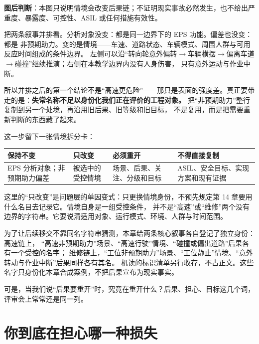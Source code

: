 \begin{noteblock}
\textbf{图后判断}：本图只说明情境会改变后果链；不证明现实事故必然发生，也不给出严重度、暴露度、可控性、ASIL 或任何措施有效性。
\end{noteblock}
把两条叙事并排看。分析对象没变：都是同一边界下的 EPS 功能。偏差也没变：都是
非预期助力。变的是情境——车速、道路状态、车辆模式、周围人群与可用反应时间组成的条件边界。
左侧可以沿“转向轮意外偏转\(\rightarrow\)车辆横摆\(\rightarrow\)偏离车道\(\rightarrow\)碰撞”继续推演；右侧在本教学边界内没有人身伤害，
只有意外运动与作业中断。

所以并排之后的第一个结论不是“高速更危险”——那只是表面的强度差。真正要带走的是：\textbf{失常名称不足以身份化我们正在评价的工程对象。} 把“非预期助力”整行复制到另一个处境，再沿用旧后果、旧等级和旧目标，
不是复用，而是把需要重新判断的东西藏了起来。

这一步留下一张情境拆分卡：

\begin{center}
\begingroup\small
\setlength{\tabcolsep}{4pt}
\begin{tabularx}{\linewidth}{@{}XXXX@{}}
\toprule
保持不变 & 只改变 & 必须重开 & 不得直接复制 \\
\midrule
EPS 分析对象；非预期助力偏差 & 被选中的受控情境 & 场景、后果、关注、分级和目标 & ASIL、安全目标、实现方案和现有证据 \\
\bottomrule
\end{tabularx}
\endgroup
\end{center}

这里的“只改变”是问题层的单因变式：只更换情境身份，不预先规定第 14 章要用什么名目去记录它。情境自身是一组受控条件，
并不是“高速”或“维修”两个没有边界的字符串。它要说清适用对象、运行模式、环境、人群与时间范围。

为了让后续移交不靠同名字符串猜测，本章给两条核心叙事各自登记了独立身份：高速链上，
“高速非预期助力”场景、“高速行驶”情境、“碰撞或偏出道路”后果各有一个受控的名字；
维修链上，“工位非预期助力”场景、“工位静止”情境、“意外转动与作业中断”后果同样各有其名。
机读的标识清单另行收存，不占正文。这些名字只身份化本章合成案例，不把后果宣布为现实事实。

可是，当我们说“后果要重开”时，究竟在重开什么？后果、担心、目标这几个词，评审会上常常还是同一列。

\section{你到底在担心哪一种损失}

